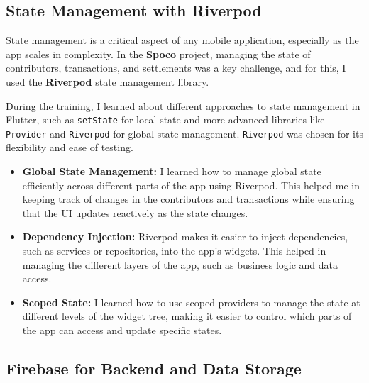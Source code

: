 \documentclass[12pt,a4paper]{report}
\begin{document}
\subsection{State Management with Riverpod}
State management is a critical aspect of any mobile application, especially as the app scales in complexity. In the \textbf{Spoco} project, managing the state of contributors, transactions, and settlements was a key challenge, and for this, I used the \textbf{Riverpod} state management library.

During the training, I learned about different approaches to state management in Flutter, such as \texttt{setState} for local state and more advanced libraries like \texttt{Provider} and \texttt{Riverpod} for global state management. \texttt{Riverpod} was chosen for its flexibility and ease of testing.

\begin{itemize}
    \item \textbf{Global State Management:} I learned how to manage global state efficiently across different parts of the app using Riverpod. This helped me in keeping track of changes in the contributors and transactions while ensuring that the UI updates reactively as the state changes.
    \item \textbf{Dependency Injection:} Riverpod makes it easier to inject dependencies, such as services or repositories, into the app’s widgets. This helped in managing the different layers of the app, such as business logic and data access.
    \item \textbf{Scoped State:} I learned how to use scoped providers to manage the state at different levels of the widget tree, making it easier to control which parts of the app can access and update specific states.
\end{itemize}

\subsection{Firebase for Backend and Data Storage}
\end{document}

